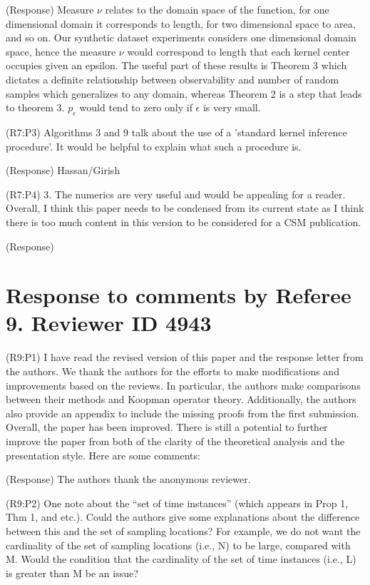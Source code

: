\documentclass{letter}
\begin{document}
{\color{red}(Response)} Measure $ \nu $ relates to the domain space of the function, for one dimensional domain it corresponds to length, for two dimensional space to area, and so on. Our synthetic dataset experiments considers one dimensional domain space, hence the measure $ \nu $ would correspond to length that each kernel center occupies given an epsilon. The useful part of these results is Theorem 3 which dictates a definite relationship between observability and number of random samples which generalizes to any domain, whereas Theorem 2 is a step that leads to theorem 3. $p_\epsilon$ would tend to zero only if $ \epsilon $ is very small.

{\color{red}(R7:P3)} Algorithms 3 and 9 talk about the use of a 'standard kernel inference procedure'. It would be helpful to explain what such a procedure is.

{\color{red}(Response)} Hassan/Girish 

{\color{red}(R7:P4)} 3. The numerics are very useful and would be appealing for a reader. Overall, I think this paper needs to be condensed from its current
state as I think there is too much content in this version to be considered for a CSM publication.

{\color{red}(Response)} 



\section{Response to comments by Referee 9. Reviewer ID 4943}

{\color{red}(R9:P1)} I have read the revised version of this paper and the response letter from the authors. We thank the authors for the efforts to make modifications and improvements based on the reviews. In particular, the authors make comparisons between their methods and Koopman operator theory. Additionally, the authors also provide an appendix to include the missing proofs from the first submission. Overall, the paper has been improved. There is still a potential to further improve the paper from both of the clarity of the theoretical analysis and the presentation style. Here are some comments:  

{\color{red}(Response)} The authors thank the anonymous reviewer.

{\color{red}(R9:P2)} One note about the “set of time instances” (which appears in Prop 1, Thm 1, and etc.). Could the authors give some explanations about the difference between this and the set of sampling locations? For example, we do not want the cardinality of the set of sampling locations (i.e., N) to be large, compared with M. Would the condition that the cardinality of the set of time instances (i.e., L) is greater than M be an issue?
\end{document}
